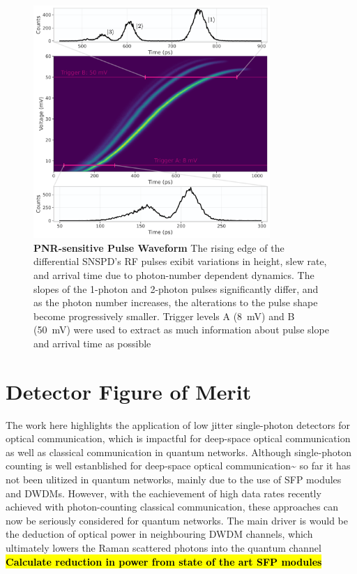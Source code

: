 \documentclass{optica-article}
\begin{document}
\hypertarget{fig:waveform}{%
\begin{figure}
\centering
\includegraphics[width=0.8\textwidth]{./figs_03/waveform_light.pdf}
\caption[{PNR-sensitive Pulse Waveform}]{\textbf{PNR-sensitive Pulse Waveform} The rising edge of the differential SNSPD's RF pulses exibit variations in height, slew rate, and arrival time due to photon-number dependent dynamics. The slopes of the 1-photon and 2-photon pulses significantly differ, and as the photon number increases, the alterations to the pulse shape become progressively smaller. Trigger levels A (8~mV) and B (50~mV) were used to extract as much information about pulse slope and arrival time as possible}
\label{fig:waveform}
\end{figure}
}

\hypertarget{detector-figure-of-merit}{%
\section{Detector Figure of Merit}\label{detector-figure-of-merit}}

The work here highlights the application of low jitter single-photon detectors for optical communication, which is impactful for deep-space optical communication as well as classical communication in quantum networks. Although single-photon counting is well estanblished for deep-space optical communication\textasciitilde{}\cite{Laser lunar, DSOC} so far it has not been ulitized in quantum networks, mainly due to the use of SFP modules and DWDMs. However, with the eachievement of high data rates recently achieved with photon-counting classical communication, these approaches can now be seriously considered for quantum networks. The main driver is would be the deduction of optical power in neighbouring DWDM channels, which ultimately lowers the Raman scattered photons into the quantum channel \cite{EraerdsRaman}
\textbf{\hl{Calculate reduction in power from state of the art SFP modules}}
\end{document}
